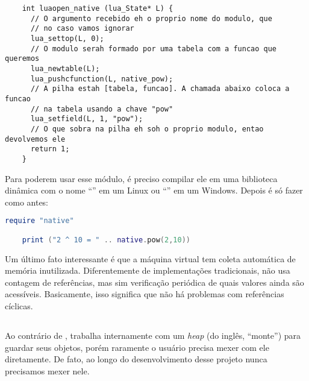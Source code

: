       \vspace{1em}

    \begin{lstlisting}
    int luaopen_native (lua_State* L) {
      // O argumento recebido eh o proprio nome do modulo, que
      // no caso vamos ignorar
      lua_settop(L, 0);
      // O modulo serah formado por uma tabela com a funcao que queremos
      lua_newtable(L);
      lua_pushcfunction(L, native_pow);
      // A pilha estah [tabela, funcao]. A chamada abaixo coloca a funcao
      // na tabela usando a chave "pow"
      lua_setfield(L, 1, "pow");
      // O que sobra na pilha eh soh o proprio modulo, entao devolvemos ele
      return 1;
    }
    \end{lstlisting}

      \vspace{1em}

      Para  poderem usar esse módulo, é preciso compilar ele em uma
      biblioteca dinâmica\footnotemark{} com o nome ``'' em um
      Linux ou ``'' em um Windows. Depois é só fazer como
      antes:


      \vspace{1em}

    \begin{lstlisting}[language=lua]
    require "native"

    print ("2 ^ 10 = " .. native.pow(2,10))
    \end{lstlisting}

      \vspace{1em}

      Um último fato interessante é que a máquina virtual tem coleta automática
      de memória inutilizada. Diferentemente de implementações tradicionais,
       não usa contagem de referências, mas sim verificação periódica
      de quais valores ainda são acessíveis. Basicamente, isso significa que não
      há problemas com referências cíclicas.

    \subsection{}
    \label{cap:conceitos:apis:python}
    Ao contrário de ,  trabalha internamente com um
    \emph{heap} (do inglês, ``monte'') para guardar seus objetos, porém raramente o usuário precisa
    mexer com ele diretamente. De fato, ao longo do desenvolvimento 
    desse projeto nunca precisamos mexer nele.


